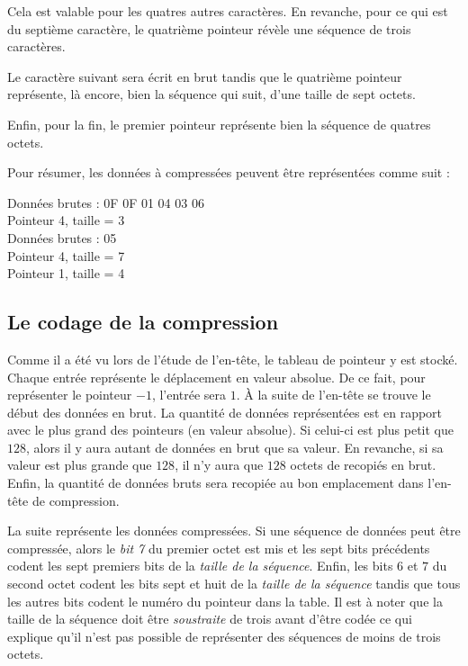 Cela est valable pour les quatres autres caractères. En revanche, pour ce qui
est du septième caractère, le quatrième pointeur révèle une séquence de trois
caractères.

Le caractère suivant sera écrit en brut tandis que le quatrième
pointeur représente, là encore, bien la séquence qui suit, d'une taille de
sept octets.

Enfin, pour la fin, le premier pointeur représente bien la séquence de quatres
octets.
\medskip

Pour résumer, les données à compressées peuvent être représentées comme suit :

\begin{exemple}
Données brutes : 0F 0F 01 04 03 06 \\
Pointeur 4, taille = 3 \\
Données brutes : 05 \\
Pointeur 4, taille = 7 \\
Pointeur 1, taille = 4
\end{exemple}


\subsection{Le codage de la compression}
Comme il a été vu lors de l'étude de l'en-tête, le tableau de pointeur y est
stocké. Chaque entrée représente le déplacement en valeur absolue. De ce fait,
pour représenter le pointeur $-1$, l'entrée sera $1$. À la suite de l'en-tête
se trouve le début des données en brut. La quantité de données représentées
est en rapport avec le plus grand des pointeurs (en valeur absolue). Si
celui-ci est plus petit que $128$, alors il y aura autant de données en brut
que sa valeur. En revanche, si sa valeur est plus grande que $128$, il n'y aura
que $128$ octets de recopiés en brut. Enfin, la quantité de données bruts
sera recopiée au bon emplacement dans l'en-tête de compression.

La suite représente les données compressées. Si une séquence de données
peut être compressée, alors le \emph{bit 7} du premier octet est mis et
les sept bits précédents codent les sept premiers bits de la \emph{taille de
la séquence}. Enfin, les bits $6$ et $7$ du second octet codent les bits
sept et huit de la \emph{taille de la séquence} tandis que tous les autres
bits codent le numéro du pointeur dans la table. Il est à noter que la taille
de la séquence doit être \emph{soustraite} de trois avant d'être codée ce qui
explique qu'il n'est pas possible de représenter des séquences de moins de
trois octets.

